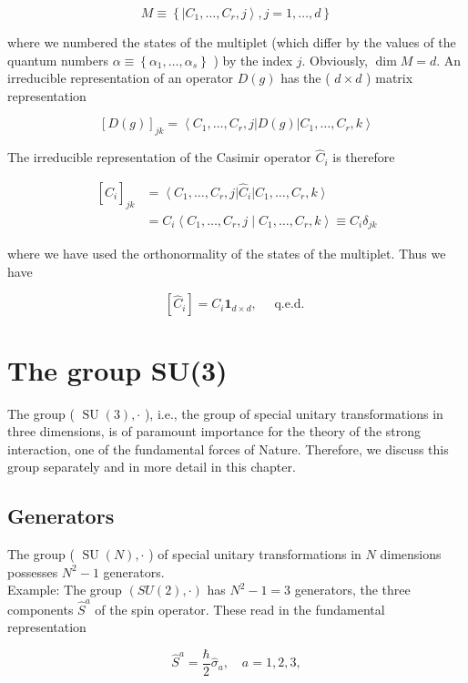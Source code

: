 \documentclass[10pt, letterpaper]{article}
\begin{document}
$$
M \equiv\left\{\left|C_{1}, \ldots, C_{r}, j\right\rangle, j=1, \ldots, d\right\}
$$

where we numbered the states of the multiplet (which differ by the values of the quantum numbers $\alpha \equiv\left\{\alpha_{1}, \ldots, \alpha_{s}\right\}$ ) by the index $j$. Obviously, $\operatorname{dim} M=d$. An irreducible representation of an operator $D(g)$ has the ( $d \times d$ ) matrix representation

$$
[D(g)]_{j k}=\left\langle C_{1}, \ldots, C_{r}, j\right| D(g)\left|C_{1}, \ldots, C_{r}, k\right\rangle
$$

The irreducible representation of the Casimir operator $\hat{C}_{i}$ is therefore

$$
\begin{aligned}
{\left[\hat{C}_{i}\right]_{j k} } & =\left\langle C_{1}, \ldots, C_{r}, j\right| \hat{C}_{i}\left|C_{1}, \ldots, C_{r}, k\right\rangle \\
& =C_{i}\left\langle C_{1}, \ldots, C_{r}, j \mid C_{1}, \ldots, C_{r}, k\right\rangle \equiv C_{i} \delta_{j k}
\end{aligned}
$$

where we have used the orthonormality of the states of the multiplet. Thus we have

$$
\left[\hat{C}_{i}\right]=C_{i} \mathbf{1}_{d \times d}, \quad \text { q.e.d. }
$$

\section{The group SU(3)}
The group ( $\operatorname{SU}(3), \cdot$ ), i.e., the group of special unitary transformations in three dimensions, is of paramount importance for the theory of the strong interaction, one of the fundamental forces of Nature. Therefore, we discuss this group separately and in more detail in this chapter.

\subsection{Generators}
The group ( $\operatorname{SU}(N), \cdot$ ) of special unitary transformations in $N$ dimensions possesses $N^{2}-1$ generators.\\
Example: The group $(S U(2), \cdot)$ has $N^{2}-1=3$ generators, the three components $\hat{S}^{a}$ of the spin operator. These read in the fundamental representation

$$
\hat{S}^{a}=\frac{\hbar}{2} \hat{\sigma}_{a}, \quad a=1,2,3,
$$
\end{document}
